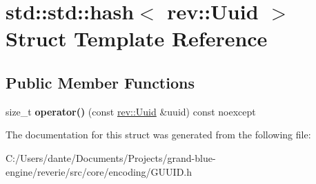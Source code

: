 \hypertarget{structstd_1_1std_1_1hash_3_01rev_1_1_uuid_01_4}{}\section{std\+::std\+::hash$<$ rev\+::Uuid $>$ Struct Template Reference}
\label{structstd_1_1std_1_1hash_3_01rev_1_1_uuid_01_4}
\subsection*{Public Member Functions}
\begin{DoxyCompactItemize}
\item 
\mbox{\label{structstd_1_1std_1_1hash_3_01rev_1_1_uuid_01_4_addf45f9d7fdfc6b52205599bdb333809}} 
size\+\_\+t {\bfseries operator()} (const \mbox{\hyperlink{classrev_1_1_uuid}{rev\+::\+Uuid}} \&uuid) const noexcept
\end{DoxyCompactItemize}


The documentation for this struct was generated from the following file\+:\begin{DoxyCompactItemize}
\item 
C\+:/\+Users/dante/\+Documents/\+Projects/grand-\/blue-\/engine/reverie/src/core/encoding/G\+U\+U\+I\+D.\+h\end{DoxyCompactItemize}
